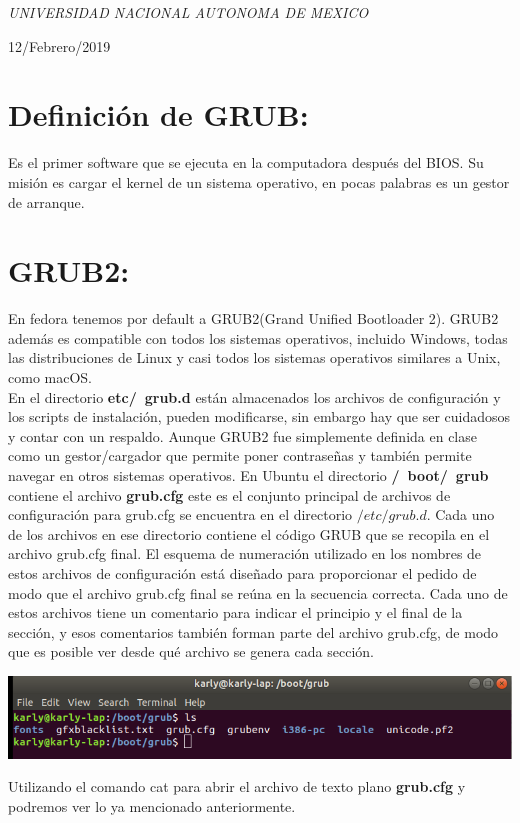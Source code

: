 \documentclass[a4paper, 11pt, oneside]{article}
\begin{document}
\begin{titlepage}
	\textit{UNIVERSIDAD NACIONAL AUTONOMA DE MEXICO} 
	
	\vfill
	
	
	
	
	\vspace{0.3\baselineskip} 
	
	12/Febrero/2019 
	
	 

\end{titlepage}
\section*{Definición de GRUB:}

Es el primer software que se ejecuta en la computadora después del BIOS. Su misión es cargar el kernel de un sistema operativo, en pocas palabras es un gestor de arranque. 

\section*{GRUB2:}
En fedora tenemos por default a GRUB2(Grand Unified Bootloader 2). GRUB2 además es compatible con todos los sistemas operativos, incluido Windows, todas las distribuciones de Linux y casi todos los sistemas operativos similares a Unix, como macOS.\\
En el directorio \textbf{etc/\ grub.d} están almacenados los archivos de configuración y los scripts de instalación, pueden modificarse, sin embargo hay que ser cuidadosos y contar con un respaldo. Aunque GRUB2 fue simplemente definida en clase como un gestor/cargador que permite poner contraseñas y también permite navegar en otros sistemas operativos.
En Ubuntu el directorio \textbf{/\ boot/\ grub} contiene el archivo \textbf{grub.cfg} este es el conjunto principal de archivos de configuración para grub.cfg se encuentra en el directorio $/etc/grub.d$. Cada uno de los archivos en ese directorio contiene el código GRUB que se recopila en el archivo grub.cfg final. El esquema de numeración utilizado en los nombres de estos archivos de configuración está diseñado para proporcionar el pedido de modo que el archivo grub.cfg final se reúna en la secuencia correcta. Cada uno de estos archivos tiene un comentario para indicar el principio y el final de la sección, y esos comentarios también forman parte del archivo grub.cfg, de modo que es posible ver desde qué archivo se genera cada sección.

\begin{center}
 \includegraphics[scale=0.20]{11202.png}
\end{center}
Utilizando el comando cat para abrir el archivo de texto plano \textbf{grub.cfg}  y podremos ver lo ya mencionado anteriormente.
\end{document}
